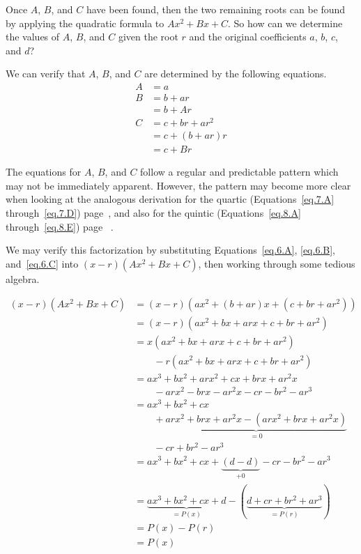 Once $A$, $B$,
and $C$ have been found, then the two remaining roots can be found by
applying the quadratic formula to $A x^2 + B x + C$.  So how can we
determine the values of $A$, $B$, and $C$ given the root $r$ and the
original coefficients $a$, $b$, $c$, and $d$?


We can verify that $A$, $B$, and $C$ are determined by the following equations.
\begin{align}
 A &= a\label{eq.6.A}\\
  B &= b + a r\nonumber\\
   &= b + A r\label{eq.6.B}\\
  C &= c + b r + a r^2\nonumber\\
  &= c + (b + a r) r\nonumber\\
  &= c + B r\label{eq.6.C}
\end{align}

The equations for $A$, $B$, and $C$ follow a regular and predictable
pattern which may not be immediately apparent.  However, the pattern
may become more clear when looking at the analogous derivation for
the quartic (Equations~\eqref{eq.7.A} through~\eqref{eq.7.D})
page~\pageref{eq.7.D}, and also for the quintic
(Equations~\eqref{eq.8.A} through~\eqref{eq.8.E}) page
~\pageref{eq.8.E}.

We may verify this factorization by substituting Equations~\eqref{eq.6.A}, \eqref{eq.6.B}, and~\eqref{eq.6.C}
into $(x-r) (A x^2 + B x + C)$, then working through some tedious algebra.

\begin{align*}
  (x-r) (A x^2 + B x + C)
  &= (x-r) (a x^2 + (b + a r) x + (c + b r + a r^2))\\
  &= (x-r) (a x^2 + b x + a r x + c + b r + a r^2)\\
  &= x(a x^2 + b x + a r x + c + b r + a r^2) \\
  &\quad\quad - r (a x^2 + b x + a r x + c + b r + a r^2)\\
  &= a x^3 + b x^2 + a r x^2 + c x + b r x + a r^2 x\\
  &\quad\quad - a r x^2 - b r x - a r^2 x - c r - b r^2 - a r^3\\
  &= a x^3 + b x^2 + c x  \\
  &\quad\quad + \underbrace{a r x^2 + b r x + a r^2 x - ( a r x^2 + b r x + a r^2 x)}_{=0} \\
  &\quad\quad  - c r + b r^2 - a r^3\\
  &= a x^3 + b x^2 + c x + \underbrace{( d - d)}_{+0} - c r - b r^2 - a r^3\\
  &= \underbrace{a x^3 + b x^2 + c x +  d}_{=P(x)} - (\underbrace{d + c r + b r^2 + a r^3}_{=P(r)})\\
  &= P(x) - P(r)\\
  &= P(x) 
\end{align*}

